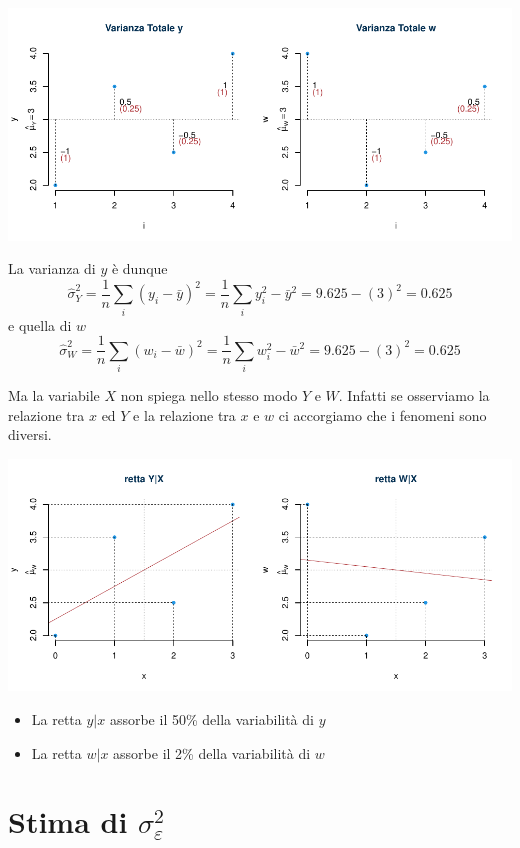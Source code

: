 \documentclass[
  11pt,
]{book}
\providecommand{\tightlist}{%
  \setlength{\itemsep}{0pt}\setlength{\parskip}{0pt}}
\theoremstyle{mytheoremstyle}
\theoremstyle{mydefstyle}
\begin{document}
\begin{center}\includegraphics{Appunti_di_Statistica_2025_files/figure-latex/17-regressione-I-62-1} \end{center}

La varianza di \(y\) è dunque
\[\hat\sigma_Y^2=\frac 1 n\sum_i (y_i - \bar y)^2 =\frac 1 n\sum_i y_i^2 - \bar y^2 =9.625 - (3)^2=0.625\]
e quella di \(w\)
\[\hat\sigma_W^2=\frac 1 n\sum_i (w_i - \bar w)^2 =\frac 1 n\sum_i w_i^2 - \bar w^2 =9.625 - (3)^2=0.625\]

Ma la variabile \(X\) non spiega nello stesso modo \(Y\) e \(W\). Infatti se osserviamo la relazione tra \(x\) ed \(Y\) e la relazione tra \(x\) e \(w\) ci accorgiamo che i fenomeni sono diversi.

\begin{center}\includegraphics{Appunti_di_Statistica_2025_files/figure-latex/17-regressione-I-63-1} \end{center}

\begin{itemize}
\tightlist
\item
  La retta \(y|x\) assorbe il 50\% della variabilità di \(y\)
\item
  La retta \(w|x\) assorbe il 2\% della variabilità di \(w\)
\end{itemize}

\section{\texorpdfstring{Stima di \(\sigma_\varepsilon^2\)}{Stima di \textbackslash sigma\_\textbackslash varepsilon\^{}2}}\label{stima-di-sigma_varepsilon2}
\end{document}
